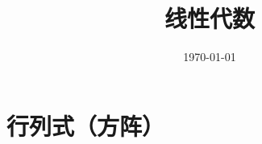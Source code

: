 \documentclass{article}
\title{线性代数}
\author{}
\date{\today}
\begin{document}
\hypersetup{
    hidelinks,
    allcolors = black,
    breaklinks = true
}

\newtheorem{definition}{Definition}[subsection]

\def\sr{\mathbb R}
\def\v{\boldsymbol v}
\def\w{\boldsymbol w}
\def\ev{\boldsymbol e}
\def\pv{\boldsymbol p}
\def\av{\boldsymbol\alpha}
\def\bv{\boldsymbol\beta}
\def\xv{\boldsymbol x}
\def\yv{\boldsymbol y}

\newcommand{\abs}[1]{\left|#1\right|}
\newcommand{\norm}[1]{\left\Vert#1\right\Vert}
\newcommand{\p}[1]{\left(#1\right)}
\newcommand{\br}[1]{\left[#1\right]}
\newcommand{\B}[1]{\left\{#1\right\}}

\begin{titlepage}
    \maketitle
\end{titlepage}

\tableofcontents
\newpage

\section{行列式（方阵）}
\end{document}
